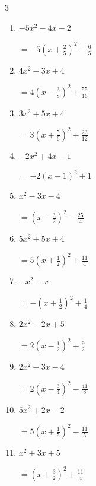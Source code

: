 \begin{multicols}{3}
\begin{enumerate}
        $\displaystyle =\left( x+\frac{1}{2}\right)^{2}+\frac{15}{4}$

\columnbreak %

  \item $-5x^{2}-4x-2$

        $\displaystyle =-5\left( x+\frac{2}{5}\right)^{2}-\frac{6}{5}$

  \item $4x^{2}-3x+4$

        $\displaystyle =4\left( x-\frac{3}{8}\right)^{2}+\frac{55}{16}$

  \item $3x^{2}+5x+4$

        $\displaystyle =3\left( x+\frac{5}{6}\right)^{2}+\frac{23}{12}$

  \item $-2x^{2}+4x-1$

        $\displaystyle =-2\left( x-1\right)^{2}+1$

  \item $x^{2}-3x-4$

        $\displaystyle =\left( x-\frac{3}{2}\right)^{2}-\frac{25}{4}$

\columnbreak %

\resetques

  \item $5x^{2}+5x+4$

        $\displaystyle =5\left( x+\frac{1}{2}\right)^{2}+\frac{11}{4}$

  \item $-x^{2}-x$

        $\displaystyle =-\left( x+\frac{1}{2}\right)^{2}+\frac{1}{4}$

  \item $2x^{2}-2x+5$

        $\displaystyle =2\left( x-\frac{1}{2}\right)^{2}+\frac{9}{2}$

  \item $2x^{2}-3x-4$

        $\displaystyle =2\left( x-\frac{3}{4}\right)^{2}-\frac{41}{8}$

  \item $5x^{2}+2x-2$

        $\displaystyle =5\left( x+\frac{1}{5}\right)^{2}-\frac{11}{5}$

\columnbreak %

  \item $x^{2}+3x+5$

        $\displaystyle =\left( x+\frac{3}{2}\right)^{2}+\frac{11}{4}$


\end{enumerate}
\end{multicols}
